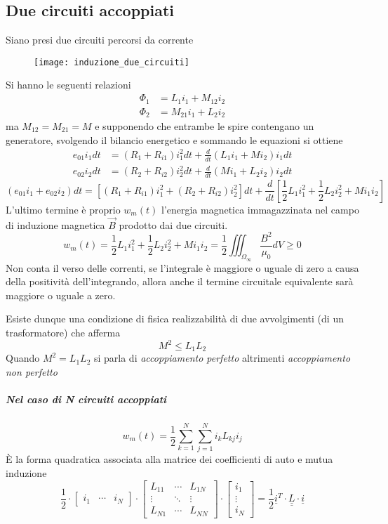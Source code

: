 \subsection{Due circuiti accoppiati}
Siano presi due circuiti percorsi da corrente
\begin{figure}[H]
\centering
\texttt{[image: induzione\_due\_circuiti]}
\end{figure}
Si hanno le seguenti relazioni
\begin{align*}
\Phi_1 & = L_1i_1 + M_{12}i_2 \\
\Phi_2 & = M_{21}i_1 + L_2i_2
\end{align*}
ma $M_{12} = M_{21} = M$ e supponendo che entrambe le spire contengano un generatore, 
svolgendo il bilancio energetico e sommando le equazioni si ottiene
\begin{align*}
e_{01}i_1dt &  = \left(R_1+R_{i1}\right)i_1^2dt + \frac{d}{dt} \left(L_1 i_1 + Mi_2 \right)i_1 dt \\
e_{02}i_2dt &  = \left(R_2+R_{i2}\right)i_2^2dt + \frac{d}{dt} \left(M i_1 + L_2i_2 \right)i_2 dt 
\end{align*}
$$
(e_{01}i_1 + e_{02}i_2) dt = \left[(R_1+R_{i1})i_1^2 + (R_2+R_{i2})i_2^2 \right]dt + 
\frac{d}{dt}\left[ \frac{1}{2}L_1i_1^2 + \frac{1}{2}L_2i_2^2 + Mi_1i_2 \right]
$$
L'ultimo termine è proprio $w_m(t)$ l'energia magnetica immagazzinata nel campo di 
induzione magnetica $\vec{B}$ prodotto dai due circuiti.
$$
w_m(t) =  \frac{1}{2}L_1i_1^2 + \frac{1}{2}L_2i_2^2 + Mi_1i_2 =\frac{1}{2}\iiint_{\Omega_\infty} \frac{B^2}{\mu_0}dV \geq 0
$$
Non conta il verso delle correnti, se l'integrale è maggiore o uguale di zero a causa
della positività dell'integrando, allora anche il termine circuitale equivalente sarà
maggiore o uguale a zero.

Esiste dunque una condizione di fisica realizzabilità di due avvolgimenti (di un 
trasformatore) che afferma
$$
M^2 \leq L_1L_2
$$
Quando $M^2 = L_1L_2$ si parla di \textit{accoppiamento perfetto} altrimenti 
\textit{accoppiamento non perfetto}
\newpage
\subparagraph{Nel caso di N circuiti accoppiati}
$$
w_m(t) = \frac{1}{2}\sum_{k=1}^N \sum_{j=1}^N i_k L_{kj} i_j
$$
È la forma quadratica associata alla matrice dei coefficienti di auto e mutua induzione
$$\frac{1}{2}\cdot
\begin{bmatrix}
i_1 & \cdots & i_N
\end{bmatrix} \cdot
\begin{bmatrix}
L_{11} & \cdots & L_{1N} \\
\vdots & \ddots & \vdots\\
L_{N1} & \cdots & L_{NN}
\end{bmatrix} \cdot
\begin{bmatrix}
i_1 \\
\vdots \\
i_N
\end{bmatrix} = \frac{1}{2} \underline{i}^T\cdot\underline{\underline{L}}\cdot\underline{i}
$$

